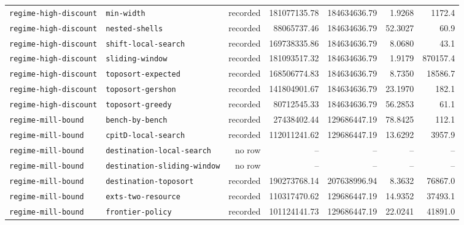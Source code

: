 \begin{longtable}{>{\raggedright\arraybackslash}p{}>{\raggedright\arraybackslash}p{}r r r r r}
\texttt{regime\allowbreak-high\allowbreak-discount} & \texttt{min\allowbreak-width} & recorded & 181077135.78 & 184634636.79 & 1.9268 & 1172.4 \\
\texttt{regime\allowbreak-high\allowbreak-discount} & \texttt{nested\allowbreak-shells} & recorded & 88065737.46 & 184634636.79 & 52.3027 & 60.9 \\
\texttt{regime\allowbreak-high\allowbreak-discount} & \texttt{shift\allowbreak-local\allowbreak-search} & recorded & 169738335.86 & 184634636.79 & 8.0680 & 43.1 \\
\texttt{regime\allowbreak-high\allowbreak-discount} & \texttt{sliding\allowbreak-window} & recorded & 181093517.32 & 184634636.79 & 1.9179 & 870157.4 \\
\texttt{regime\allowbreak-high\allowbreak-discount} & \texttt{toposort\allowbreak-expected} & recorded & 168506774.83 & 184634636.79 & 8.7350 & 18586.7 \\
\texttt{regime\allowbreak-high\allowbreak-discount} & \texttt{toposort\allowbreak-gershon} & recorded & 141804901.67 & 184634636.79 & 23.1970 & 182.1 \\
\texttt{regime\allowbreak-high\allowbreak-discount} & \texttt{toposort\allowbreak-greedy} & recorded & 80712545.33 & 184634636.79 & 56.2853 & 61.1 \\
\texttt{regime\allowbreak-mill\allowbreak-bound} & \texttt{bench\allowbreak-by\allowbreak-bench} & recorded & 27438402.44 & 129686447.19 & 78.8425 & 112.1 \\
\texttt{regime\allowbreak-mill\allowbreak-bound} & \texttt{cpitD\allowbreak-local\allowbreak-search} & recorded & 112011241.62 & 129686447.19 & 13.6292 & 3957.9 \\
\texttt{regime\allowbreak-mill\allowbreak-bound} & \texttt{destination\allowbreak-local\allowbreak-search} & no row & -- & -- & -- & -- \\
\texttt{regime\allowbreak-mill\allowbreak-bound} & \texttt{destination\allowbreak-sliding\allowbreak-window} & no row & -- & -- & -- & -- \\
\texttt{regime\allowbreak-mill\allowbreak-bound} & \texttt{destination\allowbreak-toposort} & recorded & 190273768.14 & 207638996.94 & 8.3632 & 76867.0 \\
\texttt{regime\allowbreak-mill\allowbreak-bound} & \texttt{exts\allowbreak-two\allowbreak-resource} & recorded & 110317470.62 & 129686447.19 & 14.9352 & 37493.1 \\
\texttt{regime\allowbreak-mill\allowbreak-bound} & \texttt{frontier\allowbreak-policy} & recorded & 101124141.73 & 129686447.19 & 22.0241 & 41891.0 \\

\end{longtable}
